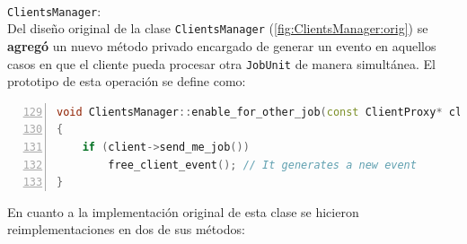 \texttt{\\ClientsManager}:\\

Del diseño original de la clase \texttt{ClientsManager} (\ref{fig:ClientsManager:orig}) se \textbf{agregó} un nuevo método privado encargado de generar un evento en aquellos casos en que el cliente pueda procesar otra \texttt{JobUnit} de manera simultánea. El prototipo de esta operación se define como:

\begin{lstlisting}[frame=shadowbox, language=C++, numbers=left, xleftmargin=8mm, framexleftmargin=22pt, basicstyle=\scriptsize, numberstyle=\footnotesize, breaklines=true, breakatwhitespace=false, captionpos=b, caption={Método \texttt{enable\_for\_other\_job()} de la clase \texttt{ClientsManager}}, label=listing:clientsmanager:enable:for:other:job, backgroundcolor=\color{gris}, firstnumber=129, keywordstyle=\color{Blue}]
void ClientsManager::enable_for_other_job(const ClientProxy* client)
{
    if (client->send_me_job())
        free_client_event(); // It generates a new event
}
\end{lstlisting}

En cuanto a la implementación original de esta clase se hicieron reimplementaciones en dos de sus métodos:


